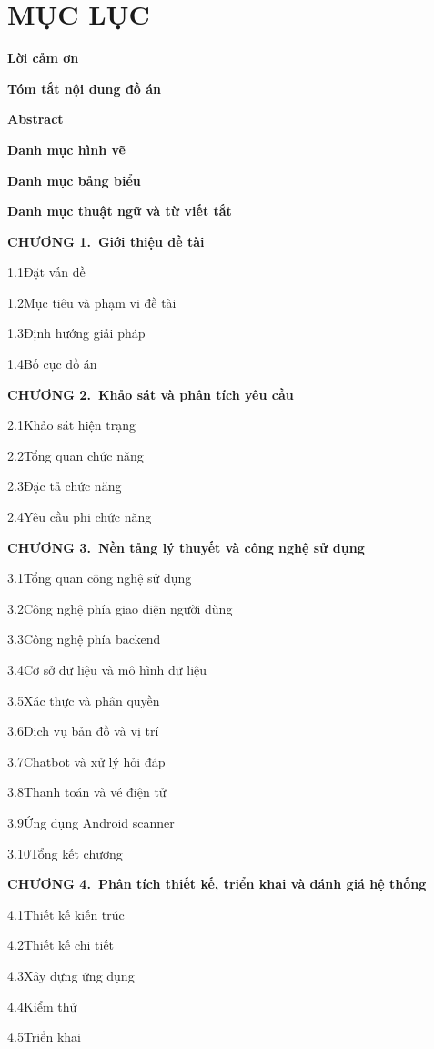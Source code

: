 \chapter*{MỤC LỤC}
\thispagestyle{empty}

\newcommand{\tocfrontmatter}[1]{%
  \noindent\textbf{#1}\dotfill\mbox{}\par\vspace{0.25cm}
}

\newcommand{\tocchaptermanual}[2]{%
  \noindent\textbf{CHƯƠNG #1.\ #2}\dotfill\mbox{}\par\vspace{0.18cm}
}

\newcommand{\tocsectionmanual}[2]{%
  \hspace*{0.9cm}#1\quad #2\dotfill\mbox{}\par\vspace{0.12cm}
}

\newcommand{\tocappendixmanual}[1]{%
  \noindent\textbf{#1}\dotfill\mbox{}\par\vspace{0.18cm}
}

\tocfrontmatter{Lời cảm ơn}
\tocfrontmatter{Tóm tắt nội dung đồ án}
\tocfrontmatter{Abstract}
\tocfrontmatter{Danh mục hình vẽ}
\tocfrontmatter{Danh mục bảng biểu}
\tocfrontmatter{Danh mục thuật ngữ và từ viết tắt}

\tocchaptermanual{1}{Giới thiệu đề tài}
\tocsectionmanual{1.1}{Đặt vấn đề}
\tocsectionmanual{1.2}{Mục tiêu và phạm vi đề tài}
\tocsectionmanual{1.3}{Định hướng giải pháp}
\tocsectionmanual{1.4}{Bố cục đồ án}

\tocchaptermanual{2}{Khảo sát và phân tích yêu cầu}
\tocsectionmanual{2.1}{Khảo sát hiện trạng}
\tocsectionmanual{2.2}{Tổng quan chức năng}
\tocsectionmanual{2.3}{Đặc tả chức năng}
\tocsectionmanual{2.4}{Yêu cầu phi chức năng}

\tocchaptermanual{3}{Nền tảng lý thuyết và công nghệ sử dụng}
\tocsectionmanual{3.1}{Tổng quan công nghệ sử dụng}
\tocsectionmanual{3.2}{Công nghệ phía giao diện người dùng}
\tocsectionmanual{3.3}{Công nghệ phía backend}
\tocsectionmanual{3.4}{Cơ sở dữ liệu và mô hình dữ liệu}
\tocsectionmanual{3.5}{Xác thực và phân quyền}
\tocsectionmanual{3.6}{Dịch vụ bản đồ và vị trí}
\tocsectionmanual{3.7}{Chatbot và xử lý hỏi đáp}
\tocsectionmanual{3.8}{Thanh toán và vé điện tử}
\tocsectionmanual{3.9}{Ứng dụng Android scanner}
\tocsectionmanual{3.10}{Tổng kết chương}

\tocchaptermanual{4}{Phân tích thiết kế, triển khai và đánh giá hệ thống}
\tocsectionmanual{4.1}{Thiết kế kiến trúc}
\tocsectionmanual{4.2}{Thiết kế chi tiết}
\tocsectionmanual{4.3}{Xây dựng ứng dụng}
\tocsectionmanual{4.4}{Kiểm thử}
\tocsectionmanual{4.5}{Triển khai}

